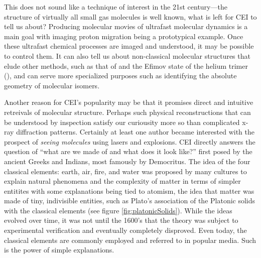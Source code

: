
This does not sound like a technique of interest in the 21st century---the structure of virtually all small gas molecules is well known, what is left for CEI to tell us about? Producing molecular movies of ultrafast molecular dynamics is a main goal with imaging proton migration being a prototypical example. Once these ultrafast chemical processes are imaged and understood, it may be possible to control them. It can also tell us about non-classical molecular structures that elude other methods, such as that of  and the Efimov state of the helium trimer (), and can serve more specialized purposes such as identifying the absolute geometry of molecular isomers.

Another reason for CEI's popularity may be that it promises direct and intuitive retreivals of molecular structure. Perhaps such physical reconstructions that can be understood by inspection satisfy our curiousity more so than complicated x-ray diffraction patterns. Certainly at least one author became interested with the prospect of \emph{seeing molecules} using lasers and explosions. CEI directly answers the question of ``what are we made of and what does it look like?'' first posed by the ancient Greeks and Indians, most famously by Democritus. The idea of the four classical elements: earth, air, fire, and water was proposed by many cultures to explain natural phenomena and the complexity of matter in terms of simpler entitites with some explanations being tied to atomism, the idea that matter was made of tiny, indivisible entities, such as Plato's association of the Platonic solids with the classical elements (see figure \ref{fig:platonicSolids}). While the ideas evolved over time, it was not until the 1600's that the theory was subject to experimental verification and eventually completely disproved. Even today, the classical elements are commonly employed and referred to in popular media. Such is the power of simple explanations.

